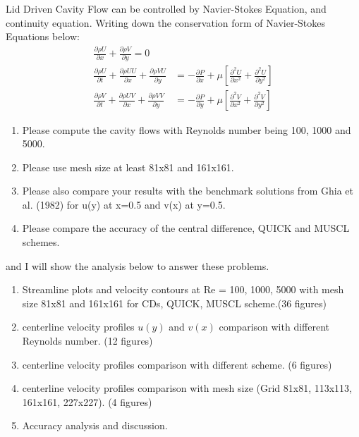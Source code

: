 \documentclass[12pt]{article}
\theoremstyle{plain}  %
\theoremstyle{definition}  %
\begin{document}
\noindent Lid Driven Cavity Flow can be controlled by Navier-Stokes Equation, and continuity equation. Writing down the conservation form of Navier-Stokes Equations below: 
\begin{equation}
\begin{aligned}
\frac{\partial \rho U}{\partial x} + \frac{\partial \rho V}{\partial y} = 0 \\[1.5ex]
\frac{\partial \rho U}{\partial t} + \frac{\partial \rho UU}{\partial x} + \frac{\partial \rho VU}{\partial y} &= -\frac{\partial P}{\partial x} + \mu\left[\frac{\partial^2 U}{\partial x^2} + \frac{\partial^2 U}{\partial y^2}\right] \\[1.5ex]
\frac{\partial \rho V}{\partial t} + \frac{\partial \rho UV}{\partial x} + \frac{\partial \rho VV}{\partial y} &= -\frac{\partial P}{\partial y} + \mu\left[\frac{\partial^2 V}{\partial x^2} + \frac{\partial^2 V}{\partial y^2}\right]
\end{aligned}
\end{equation}
\begin{enumerate}[label=(\alph*)]
    \item Please compute the cavity flows with Reynolds number being 100, 1000 and 5000.  
    \item Please use mesh size at least 81x81 and 161x161.
    \item Please also compare your results with the benchmark solutions from Ghia et al. (1982) for u(y) at
x=0.5 and v(x) at y=0.5.
    \item Please compare the accuracy of the central difference, QUICK and MUSCL schemes.
\end{enumerate}
and I will show the analysis below to answer these problems.
\\[1.5ex]
{\color{blue}
\begin{enumerate}
    \item Streamline plots and velocity contours at Re = 100, 1000, 5000 with mesh size 81x81 and 161x161 for CDs, QUICK, MUSCL scheme.(36 figures)
    \item centerline velocity profiles $u(y)$ and $v(x)$ comparison with different Reynolds number. (12 figures)
    \item centerline velocity profiles comparison with different scheme. (6 figures)
    \item centerline velocity profiles comparison with mesh size (Grid 81x81, 113x113, 161x161, 227x227). (4 figures)
    \item Accuracy analysis and discussion.
  \end{enumerate}
}
\end{document}
